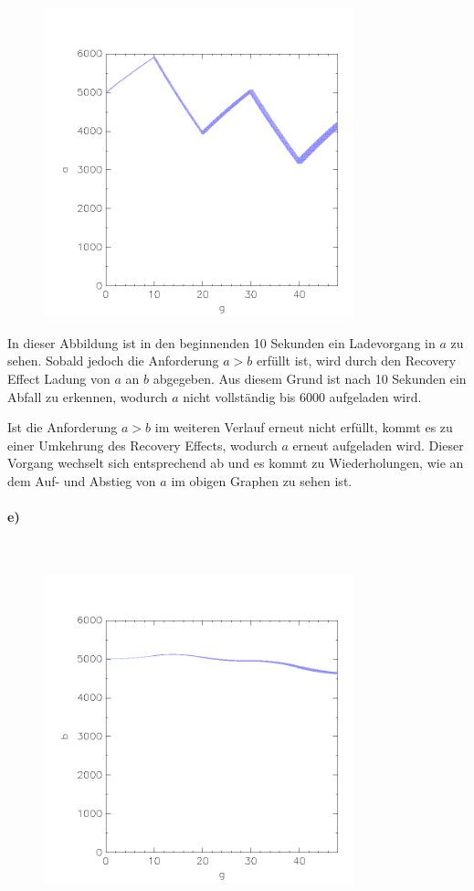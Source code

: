 \begin{figure}[H]
	\centering
	\includegraphics[width=0.8\textwidth]{Aufgabe_d).png}
\end{figure}

In dieser Abbildung ist in den beginnenden 10 Sekunden ein Ladevorgang in $a$ zu sehen. Sobald jedoch die Anforderung $a>b$ erfüllt ist, wird durch den Recovery Effect Ladung von $a$ an $b$ abgegeben. Aus diesem Grund ist nach 10 Sekunden ein Abfall zu erkennen, wodurch $a$ nicht vollständig bis 6000 aufgeladen wird. 


Ist die Anforderung $a>b$ im weiteren Verlauf erneut nicht erfüllt, kommt es zu einer Umkehrung des Recovery Effects, wodurch $a$ erneut aufgeladen wird. Dieser Vorgang wechselt sich entsprechend ab und es kommt zu Wiederholungen, wie an dem Auf- und Abstieg von $a$ im obigen Graphen zu sehen ist. 

\paragraph{e)}\mbox{} \\

\begin{figure}[H]
	\centering
	\includegraphics[width=0.8\textwidth]{Aufgabe_e).png}
\end{figure}

